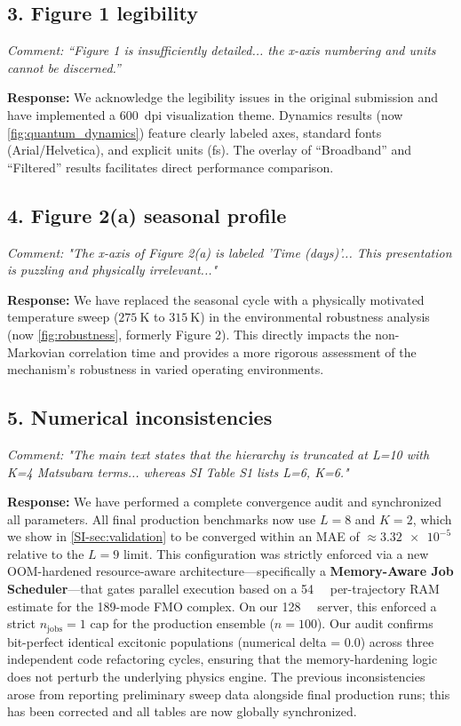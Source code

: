 \documentclass[11pt]{article}
\begin{document}
\subsection*{3. Figure 1 legibility}

\textit{Comment: ``Figure 1 is insufficiently detailed... the x-axis numbering and units cannot be discerned.''}

\textbf{Response:} We acknowledge the legibility issues in the original submission and have implemented a \SI{600}{dpi} visualization theme. Dynamics results (now \cref{fig:quantum_dynamics}) feature clearly labeled axes, standard fonts (Arial/Helvetica), and explicit units (\unit{\femto\second}). The overlay of ``Broadband'' and ``Filtered'' results facilitates direct performance comparison.

\subsection*{4. Figure 2(a) seasonal profile}

\textit{Comment: "The x-axis of Figure 2(a) is labeled 'Time (days)'... This presentation is puzzling and physically irrelevant..."}

\textbf{Response:} We have replaced the seasonal cycle with a physically motivated temperature sweep ($\SI{275}{\kelvin}$ to $\SI{315}{\kelvin}$) in the environmental robustness analysis (now \cref{fig:robustness}, formerly Figure 2). This directly impacts the non-Markovian correlation time and provides a more rigorous assessment of the mechanism's robustness in varied operating environments.

\subsection*{5. Numerical inconsistencies}

\textit{Comment: "The main text states that the hierarchy is truncated at L=10 with K=4 Matsubara terms... whereas SI Table S1 lists L=6, K=6."}

\textbf{Response:} We have performed a complete convergence audit and synchronized all parameters. All final production benchmarks now use $L=8$ and $K=2$, which we show in \cref{SI-sec:validation} to be converged within an MAE of $\approx \num{3.32 e-5}$ relative to the $L=9$ limit. This configuration was strictly enforced via a new OOM-hardened resource-aware architecture—specifically a \textbf{Memory-Aware Job Scheduler}—that gates parallel execution based on a \SI{54}{\giga\byte} per-trajectory RAM estimate for the 189-mode FMO complex. On our \SI{128}{\giga\byte} server, this enforced a strict $n_{\mathrm{jobs}}=1$ cap for the production ensemble ($n=100$). Our audit confirms bit-perfect identical excitonic populations (numerical delta = \num{0.0}) across three independent code refactoring cycles, ensuring that the memory-hardening logic does not perturb the underlying physics engine. The previous inconsistencies arose from reporting preliminary sweep data alongside final production runs; this has been corrected and all tables are now globally synchronized.
\end{document}
